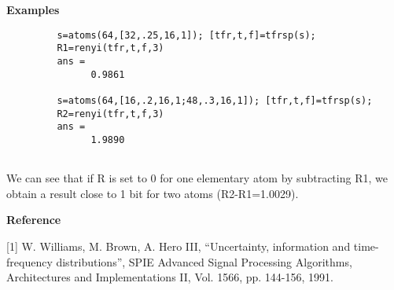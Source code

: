 \newpage

{\bf \large {}\selectfont Examples}\\
\hspace*{1.5cm}
\begin{minipage}[t]{13.5cm}

\begin{verbatim}
         s=atoms(64,[32,.25,16,1]); [tfr,t,f]=tfrsp(s); 
         R1=renyi(tfr,t,f,3) 
         ans =
               0.9861

         s=atoms(64,[16,.2,16,1;48,.3,16,1]); [tfr,t,f]=tfrsp(s); 
         R2=renyi(tfr,t,f,3) 
         ans =
               1.9890
         
\end{verbatim}
We can see that if {\ttfamily R} is set to 0 for one elementary atom by
subtracting {\ttfamily R1}, we obtain a result close to 1 bit for two atoms
({\ttfamily R2-R1}=1.0029).
\end{minipage}
\vspace*{.5cm}


{\bf \large {}\selectfont Reference}\\
\hspace*{1.5cm}
\begin{minipage}[t]{13.5cm}
[1] W. Williams, M. Brown, A. Hero III, ``Uncertainty, information and
   time-frequency distributions'', SPIE Advanced Signal Processing
   Algorithms, Architectures and Implementations II, Vol. 1566,
   pp. 144-156, 1991.
\end{minipage}


